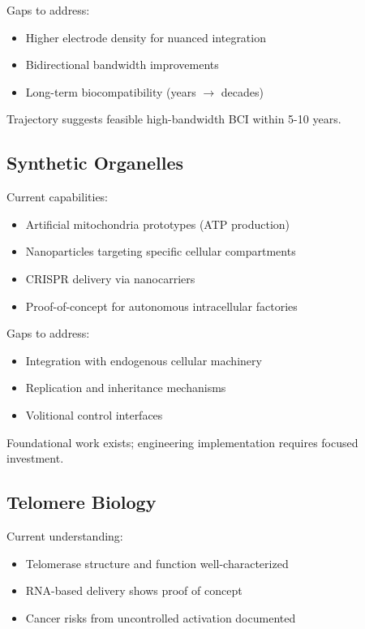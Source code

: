 \documentclass[reprint, amsmath, amssymb, aps, prd]{revtex4-2}
\begin{document}
Gaps to address:
\begin{itemize}
    \item Higher electrode density for nuanced integration
    \item Bidirectional bandwidth improvements
    \item Long-term biocompatibility (years $\rightarrow$ decades)
\end{itemize}

Trajectory suggests feasible high-bandwidth BCI within 5-10 years.

\subsection{Synthetic Organelles}

Current capabilities:
\begin{itemize}
    \item Artificial mitochondria prototypes (ATP production)
    \item Nanoparticles targeting specific cellular compartments
    \item CRISPR delivery via nanocarriers
    \item Proof-of-concept for autonomous intracellular factories
\end{itemize}

Gaps to address:
\begin{itemize}
    \item Integration with endogenous cellular machinery
    \item Replication and inheritance mechanisms
    \item Volitional control interfaces
\end{itemize}

Foundational work exists; engineering implementation requires focused investment.

\subsection{Telomere Biology}

Current understanding:
\begin{itemize}
    \item Telomerase structure and function well-characterized
    \item RNA-based delivery shows proof of concept
    \item Cancer risks from uncontrolled activation documented
\end{itemize}
\end{document}
